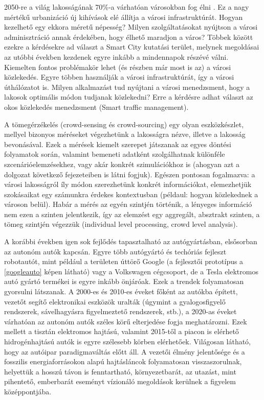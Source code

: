 \documentclass[a4paper,12pt]{report}
\begin{document}
2050-re a világ lakosságának 70\%-a várhatóan városokban fog élni \cite{unpopulation}. Ez a nagy mértékű urbanizáció új kihívások elé állítja a városi infrastruktúrát. Hogyan kezelhető egy ekkora méretű népesség? Milyen szolgáltatásokat nyújtson a városi adminisztráció annak érdekében, hogy élhető maradjon a város? Többek között ezekre a kérdésekre ad választ a Smart City kutatási terület, melynek megoldásai az utóbbi években kezdenek egyre inkább a mindennapok részévé válni. Kiemelten fontos problémakör lehet (és részben már most is az) a városi közlekedés. Egyre többen használják a városi infrastruktúrát, így a városi úthálózatot is. Milyen alkalmazást tud nyújtani a városi menedzsment, hogy a lakosok optimális módon tudjanak közlekedni? Erre a kérdésre adhat választ az okos közlekedés menedzsment (Smart traffic management).

A tömegérzékelés (crowd-sensing és crowd-sourcing) egy olyan eszközkészlet, mellyel bizonyos méréseket végezhetünk a lakosságra nézve, illetve a lakosság bevonásával. Ezek a mérések kiemelt szerepet játszanak az egyes döntési folyamatok során, valamint bemeneti adatként szolgálhatnak különféle szcenárióelemzésekhez, vagy akár konkrét szimulációkhoz is (ahogyan azt a dolgozat következő fejezeteiben is látni fogjuk). Egészen pontosan fogalmazva: a városi lakosságról íly módon szerezhetünk konkrét információkat, elemezhetjük szokásaikat egy számunkra érdekes kontextusban (példaul: hogyan közlekednek a városon belül). Habár a mérés az egyén szintjén történik, a lényeges információ nem ezen a szinten jelentkezik, így az elemzést egy aggregált, absztrakt szinten, a tömeg szintjén végezzük (individual level processing, crowd level analysis).

A korábbi években igen sok fejlődés tapasztalható az autógyártásban, elsősorban az autonóm autók kapcsán. Egyre több autógyártó és techóriás fejleszt robotautót, mint például a területen úttörő Google (a fejlesztői prototípus a \ref{googleauto} képen látható) vagy a Volkswagen cégcsoport, de a Tesla elektromos autó gyártó termékei is egyre inkább önjáróak. Ezek a trendek folyamatosan gyorsulni látszanak. A 2000-es és 2010-es éveket főként az autókba épített, vezetőt segítő elektronikai eszközök uralták (úgymint a gyalogosfigyelő rendszerek, sávelhagyásra figyelmeztető rendszerek, stb.), a 2020-as éveket várhatóan az autonóm autók széles körű elterjedése fogja meghatározni. Ezek mellett a tisztán elektromos hajtású, valamint 2015-től a piacon is elérhető hidrogénhajtású autók is egyre szélesebb körben elérhetőek. Világosan látható, hogy az autóipar paradigmaváltás előtt áll. A vezetői élmény jelentősége és a fosszilis energiaforrásokon alapú hajtásláncok folyamatosan visszaszorulnak, helyettük a hosszú távon is fenntartható, környezetbarát, az utazást, mint pihentető, emberbarát eseményt vízionáló megoldások kerülnek a figyelem középpontjába.
\end{document}
